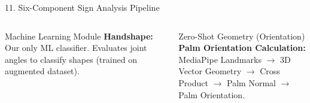 \documentclass[aspectratio=169]{beamer}
\begin{document}
\begin{frame}{11. Six-Component Sign Analysis Pipeline}
\begin{tikzpicture}
    \end{tikzpicture}
    
    \vspace{4mm}
    \begin{columns}[T]
        \begin{block}{Machine Learning Module}
            \scriptsize
            \textbf{Handshape:} Our only ML classifier. Evaluates joint angles to classify shapes (trained on augmented dataset).
        \end{block}
        
        \begin{block}{Zero-Shot Geometry (Orientation)}
            \scriptsize
            \textbf{Palm Orientation Calculation:} \\
            MediaPipe Landmarks $\to$ 3D Vector Geometry $\to$ Cross Product $\to$ Palm Normal $\to$ Palm Orientation.
        \end{block}
    \end{columns}
\end{frame}
\end{document}
